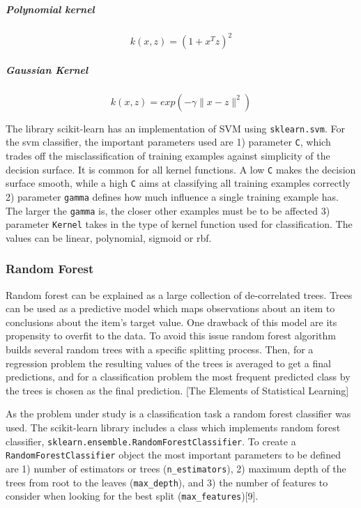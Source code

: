 \documentclass[letterpaper,10pt]{article}
\theoremstyle{mytheor}
\begin{document}
\subparagraph{Polynomial kernel}
\begin{equation}
k(x, z) = (1 + x^T z)^2
\end{equation}

\subparagraph{Gaussian Kernel}
\begin{equation}
k(x, z) = exp(-\gamma\|x-z\|^2)
\end{equation}

The library scikit-learn has an implementation of SVM using \lstinline|sklearn.svm|. For the svm classifier, the important  parameters used are 1) parameter \lstinline|C|, which trades off the misclassification of training examples against simplicity of the decision surface. It is common for all kernel functions. A low \lstinline|C| makes the decision surface smooth, while a high \lstinline|C| aims at classifying all training examples correctly 2) parameter \lstinline|gamma| defines how much influence a single training example has. The larger the \lstinline|gamma| is, the closer other examples must be to be affected 3) parameter \lstinline|Kernel| takes in the type of kernel function used for classification. The values can be linear, polynomial, sigmoid or rbf.


\subsubsection{Random Forest}
Random forest can be explained as a large collection of de-correlated trees. Trees can be used as a predictive model which maps observations about an item to conclusions about the item's target value. One drawback of this model are its propensity  to overfit to the data. To avoid this issue random forest algorithm builds several random trees with a specific splitting process. Then, for a regression problem the resulting values of the trees is averaged to get a final predictions, and for a classification problem the most frequent predicted class by the trees is chosen as the final prediction. [The Elements of Statistical Learning]

As the problem under study is a classification task a random forest classifier was used. The scikit-learn library includes a class which implements random forest classifier, \lstinline|sklearn.ensemble.RandomForestClassifier|. To create a \lstinline|RandomForestClassifier| object the most important parameters to be defined are 1)  number of estimators or trees (\lstinline|n_estimators|), 2) maximum depth of the trees from root to the leaves (\lstinline|max_depth|), and  3) the number of features to consider when looking for the best split (\lstinline|max_features|)[9]. 
\end{document}
